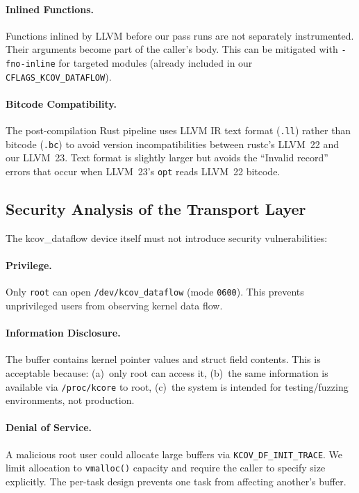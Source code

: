 \documentclass{ndss}
\begin{document}
\paragraph{Inlined Functions.} Functions inlined by LLVM before our pass runs
are not separately instrumented. Their arguments become part of the caller's
body. This can be mitigated with \texttt{-fno-inline} for targeted modules
(already included in our \texttt{CFLAGS\_KCOV\_DATAFLOW}).

\paragraph{Bitcode Compatibility.} The post-compilation Rust pipeline uses LLVM
IR text format (\texttt{.ll}) rather than bitcode (\texttt{.bc}) to avoid
version incompatibilities between rustc's LLVM~22 and our LLVM~23. Text format
is slightly larger but avoids the ``Invalid record'' errors that occur when
LLVM~23's \texttt{opt} reads LLVM~22 bitcode.

\subsection{Security Analysis of the Transport Layer}

The kcov\_dataflow device itself must not introduce security vulnerabilities:

\paragraph{Privilege.} Only \texttt{root} can open \texttt{/dev/kcov\_dataflow}
(mode \texttt{0600}). This prevents unprivileged users from observing kernel
data flow.

\paragraph{Information Disclosure.} The buffer contains kernel pointer values
and struct field contents. This is acceptable because: (a)~only root can access
it, (b)~the same information is available via \texttt{/proc/kcore} to root,
(c)~the system is intended for testing/fuzzing environments, not production.

\paragraph{Denial of Service.} A malicious root user could allocate large
buffers via \texttt{KCOV\_DF\_INIT\_TRACE}. We limit allocation to
\texttt{vmalloc()} capacity and require the caller to specify size explicitly.
The per-task design prevents one task from affecting another's buffer.
\end{document}
